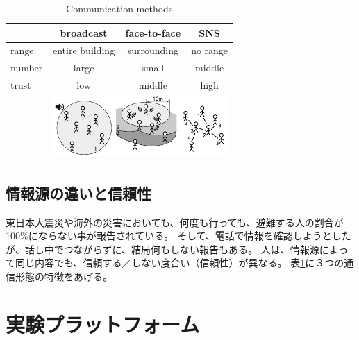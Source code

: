\documentclass[a4j]{jarticle}
\begin{document}
\begin{table}[h]
\centering
\caption{Communication methods}
\label{tab:communication-methods}
\begin{tabular}{|l||c|c|c|}\hline
          & broadcast & face-to-face & SNS \\ \hline\hline
range     & entire building & surrounding & no range \\ \hline
number    & large & small & middle \\ \hline
trust     & low & middle & high \\ \hline
          &\multicolumn{3}{l|}{\includegraphics[width=6.7cm]{fig/trans-model.pdf}}\\\hline
\end{tabular}
\end{table}




\subsection{情報源の違いと信頼性}
東日本大震災や海外の災害においても、何度も行っても、避難する人の割合が100\%にならない事が報告されている。
そして、電話で情報を確認しようとしたが、話し中でつながらずに、結局何もしない報告もある。
人は、情報源によって同じ内容でも、信頼する／しない度合い（信頼性）が異なる。
表\ref{tab:communication-methods}に３つの通信形態の特徴をあげる。




\section{実験プラットフォーム}
\end{document}
